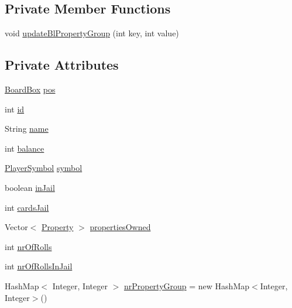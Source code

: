 \subsection*{Private Member Functions}
\begin{DoxyCompactItemize}
\item 
void \hyperlink{class_monopoly_1_1_logic_1_1_player_aa83dcde7cc131bad1ad8b91d2b3a11ab}{update\+Bl\+Property\+Group} (int key, int value)
\end{DoxyCompactItemize}
\subsection*{Private Attributes}
\begin{DoxyCompactItemize}
\item 
\hyperlink{class_monopoly_1_1_logic_1_1_board_box}{Board\+Box} \hyperlink{class_monopoly_1_1_logic_1_1_player_a94388e91629f1f055fed991fd202e1b8}{pos}
\item 
int \hyperlink{class_monopoly_1_1_logic_1_1_player_a30de4a228019d4020511fb2f573901dd}{id}
\item 
String \hyperlink{class_monopoly_1_1_logic_1_1_player_ac9a1abcd87e522434ec657f541c69647}{name}
\item 
int \hyperlink{class_monopoly_1_1_logic_1_1_player_adee3b4a4dea242b17568e6d93922a698}{balance}
\item 
\hyperlink{class_monopoly_1_1_logic_1_1_player_symbol}{Player\+Symbol} \hyperlink{class_monopoly_1_1_logic_1_1_player_a0171902866c205d6dfbd11e89ede9ac3}{symbol}
\item 
boolean \hyperlink{class_monopoly_1_1_logic_1_1_player_a97afe5ab76ab1b1377a9e8243643fcb6}{in\+Jail}
\item 
int \hyperlink{class_monopoly_1_1_logic_1_1_player_ad7bbacda03a02a34878a016ae15fc318}{cards\+Jail}
\item 
Vector$<$ \hyperlink{class_monopoly_1_1_logic_1_1_property}{Property} $>$ \hyperlink{class_monopoly_1_1_logic_1_1_player_a76602a9679f9c17d106a8759be794432}{properties\+Owned}
\item 
int \hyperlink{class_monopoly_1_1_logic_1_1_player_ad28b2ca6fdd80ae724e784bd297a0379}{nr\+Of\+Rolls}
\item 
int \hyperlink{class_monopoly_1_1_logic_1_1_player_a618fa9b7485c6135836cefe36118b81e}{nr\+Of\+Rolls\+In\+Jail}
\item 
Hash\+Map$<$ Integer, Integer $>$ \hyperlink{class_monopoly_1_1_logic_1_1_player_a939544a6ef5a533d9ef382cf6a9083ae}{nr\+Property\+Group} = new Hash\+Map$<$Integer, Integer$>$()

\end{DoxyCompactItemize}
